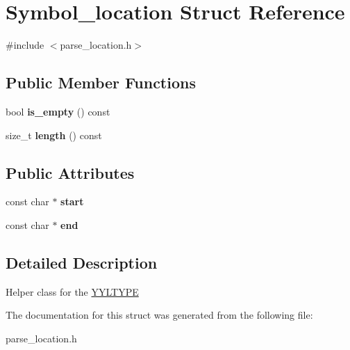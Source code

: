 \hypertarget{structSymbol__location}{}\section{Symbol\+\_\+location Struct Reference}
\label{structSymbol__location}


{\ttfamily \#include $<$parse\+\_\+location.\+h$>$}

\subsection*{Public Member Functions}
\begin{DoxyCompactItemize}
\item 
\mbox{\label{structSymbol__location_a095b1b19889a25a711884a6841ddc9c2}} 
bool {\bfseries is\+\_\+empty} () const
\item 
\mbox{\label{structSymbol__location_aeb87436f7576e6c61aa981da4ad61232}} 
size\+\_\+t {\bfseries length} () const
\end{DoxyCompactItemize}
\subsection*{Public Attributes}
\begin{DoxyCompactItemize}
\item 
\mbox{\label{structSymbol__location_aa0bb5e2d6e12e5fe855d9378e34e9357}} 
const char $\ast$ {\bfseries start}
\item 
\mbox{\label{structSymbol__location_abf98d649009d50ef5b60c819df2d469a}} 
const char $\ast$ {\bfseries end}
\end{DoxyCompactItemize}


\subsection{Detailed Description}
Helper class for the \mbox{\hyperlink{structYYLTYPE}{Y\+Y\+L\+T\+Y\+PE}} 

The documentation for this struct was generated from the following file\+:\begin{DoxyCompactItemize}
\item 
parse\+\_\+location.\+h\end{DoxyCompactItemize}
